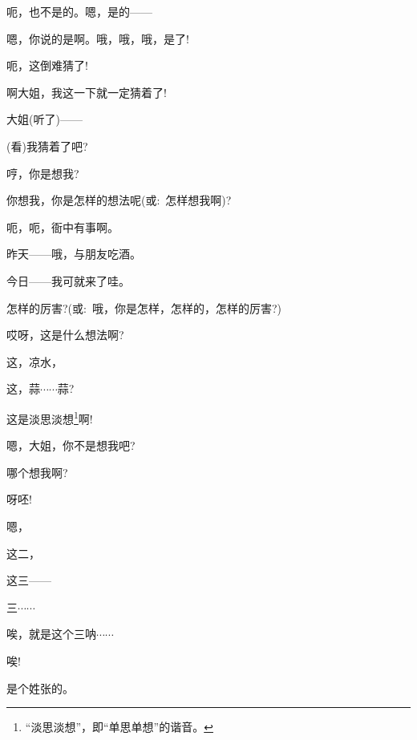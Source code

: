 {{呃，也不是的。嗯，是的------}


{嗯，你说的是啊。哦，哦，哦，是了!}


{呃，这倒难猜了!}


{啊大姐，我这一下就一定猜着了!}

{大姐(听了)------}


{(看)我猜着了吧?}

{哼，你是想我?}

{你想我，你是怎样的想法呢({\akai 或}:~怎样想我啊)?}

{呃，呃，衙中有事啊。}

{昨天------哦，与朋友吃酒。}

{今日------我可就来了哇。}

{怎样的厉害?({\akai 或}:~哦，你是怎样，怎样的，怎样的厉害?)}

{哎呀，这是什么想法啊?}

{这，凉水，}

{这，蒜$\cdots{}\cdots{}$蒜?}

{这是淡思淡想}\footnote{``淡思淡想''，即``单思单想''的谐音。}{啊!}

{嗯，大姐，你不是想我吧?}

{哪个想我啊?}

{呀呸!}


{嗯，}

{这二，}

{这三------}

{三$\cdots{}\cdots{}$}

{唉，就是这个三呐$\cdots{}\cdots{}$}


{唉!}


{是个姓张的。}

}
